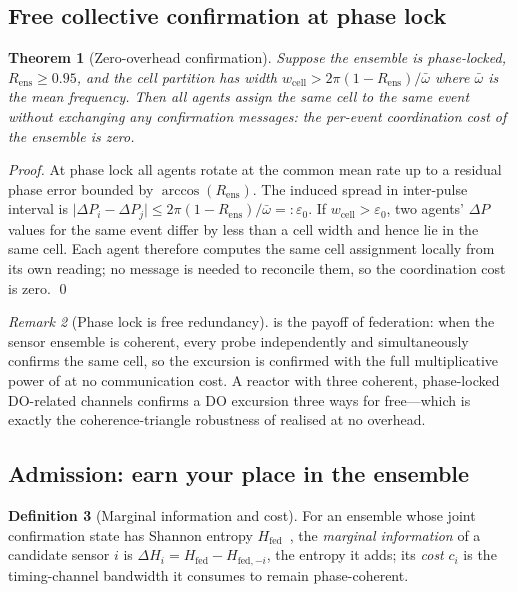 \documentclass[11pt,a4paper,twocolumn]{article}
\theoremstyle{thmstyle}
\newtheorem{theorem}{Theorem}[section]
\theoremstyle{definition}
\newtheorem{definition}[theorem]{Definition}
\theoremstyle{remark}
\newtheorem{remark}[theorem]{Remark}
\newcommand{\DP}{\Delta P}
\newcommand{\wcell}{w_{\mathrm{cell}}}
\newcommand{\Rens}{R_{\mathrm{ens}}}
\newcommand{\abs}[1]{\lvert#1\rvert}
\begin{document}
\subsection{Free collective confirmation at phase lock}

\begin{theorem}[Zero-overhead confirmation]
\label{thm:zero}
Suppose the ensemble is phase-locked, $\Rens\ge0.95$, and the cell
partition has width $\wcell>2\pi(1-\Rens)/\bar\omega$ where
$\bar\omega$ is the mean frequency. Then all agents assign the same cell
to the same event without exchanging any confirmation messages: the
per-event coordination cost of the ensemble is zero.
\end{theorem}

\begin{proof}
At phase lock all agents rotate at the common mean rate up to a residual
phase error bounded by $\arccos(\Rens)$. The induced spread in
inter-pulse interval is
$\abs{\DP_i-\DP_j}\le2\pi(1-\Rens)/\bar\omega=:\varepsilon_0$. If
$\wcell>\varepsilon_0$, two agents' $\DP$ values for the same event differ
by less than a cell width and hence lie in the same cell. Each agent
therefore computes the same cell assignment locally from its own reading;
no message is needed to reconcile them, so the coordination cost is zero.
\qed
\end{proof}

\begin{remark}[Phase lock is free redundancy]
\label{rem:zero}
 is the payoff of federation: when the sensor ensemble is
coherent, every probe independently and simultaneously confirms the same
cell, so the excursion is confirmed with the full multiplicative power of
 at no communication cost. A reactor with three
coherent, phase-locked DO-related channels confirms a DO excursion three
ways for free---which is exactly the coherence-triangle robustness of
 realised at no overhead.
\end{remark}

\subsection{Admission: earn your place in the ensemble}

\begin{definition}[Marginal information and cost]
\label{def:admission}
For an ensemble whose joint confirmation state has Shannon entropy
$H_{\mathrm{fed}}$~\citep{shannon1948mathematical,cover2006elements}, the
\emph{marginal information} of a candidate sensor $i$ is
$\Delta H_i=H_{\mathrm{fed}}-H_{\mathrm{fed},-i}$, the entropy it adds;
its \emph{cost} $c_i$ is the timing-channel bandwidth it consumes to
remain phase-coherent.
\end{definition}
\end{document}
